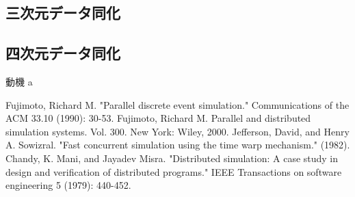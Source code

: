 \documentclass[dvipdfmx,uplatex,11pt]{beamer}
\theoremstyle{definition}
\begin{document}
 \subsection{三次元データ同化}
 \subsection{四次元データ同化}
\begin{frame}{動機}
  a
\end{frame}

\begin{thebibliography}{n}
   Fujimoto, Richard M. "Parallel discrete event simulation." Communications of the ACM 33.10 (1990): 30-53.
   Fujimoto, Richard M. Parallel and distributed simulation systems. Vol. 300. New York: Wiley, 2000.
   Jefferson, David, and Henry A. Sowizral. "Fast concurrent simulation using the time warp mechanism." (1982).
   Chandy, K. Mani, and Jayadev Misra. "Distributed simulation: A case study in design and verification of distributed programs." IEEE Transactions on software engineering 5 (1979): 440-452.
\end{thebibliography}
\end{document}
